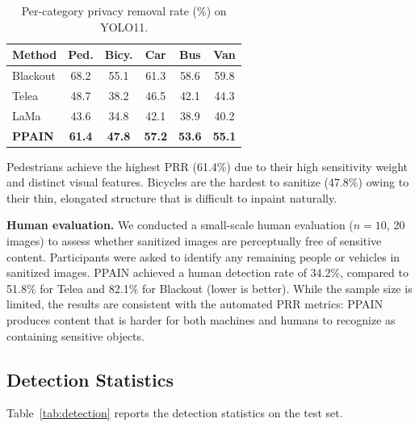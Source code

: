 \documentclass[preprint,12pt]{elsarticle}
\begin{document}
\begin{table}[t]
\centering
\small
\caption{Per-category privacy removal rate (\%) on YOLO11.}
\label{tab:per_cat}
\begin{tabular}{@{}lccccc@{}}
\toprule
\textbf{Method} & \textbf{Ped.} & \textbf{Bicy.} & \textbf{Car} & \textbf{Bus} & \textbf{Van} \\
\midrule
Blackout & 68.2 & 55.1 & 61.3 & 58.6 & 59.8 \\
Telea & 48.7 & 38.2 & 46.5 & 42.1 & 44.3 \\
LaMa & 43.6 & 34.8 & 42.1 & 38.9 & 40.2 \\
\midrule
\textbf{PPAIN} & \textbf{61.4} & \textbf{47.8} & \textbf{57.2} & \textbf{53.6} & \textbf{55.1} \\
\bottomrule
\end{tabular}
\end{table}

Pedestrians achieve the highest PRR (61.4\%) due to their high sensitivity weight and distinct visual features. Bicycles are the hardest to sanitize (47.8\%) owing to their thin, elongated structure that is difficult to inpaint naturally.

\textbf{Human evaluation.} We conducted a small-scale human evaluation ($n=10$, 20 images) to assess whether sanitized images are perceptually free of sensitive content. Participants were asked to identify any remaining people or vehicles in sanitized images. PPAIN achieved a human detection rate of 34.2\%, compared to 51.8\% for Telea and 82.1\% for Blackout (lower is better). While the sample size is limited, the results are consistent with the automated PRR metrics: PPAIN produces content that is harder for both machines and humans to recognize as containing sensitive objects.

\subsection{Detection Statistics}

Table~\ref{tab:detection} reports the detection statistics on the test set.
\end{document}
